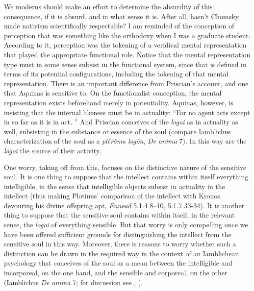 \documentclass[12pt]{article}
\begin{document}
We moderns should make an effort to determine the absurdity of this consequence, if it is absurd, and in what sense it is. After all, hasn't Chomsky made nativism scientifically respectable? I am reminded of the conception of perception that was something like the orthodoxy when I was a graduate student. According to it, perception was the tokening of a veridical mental representation that played the appropriate functional role. Notice that the mental representation type must in some sense subsist in the functional system, since that is defined in terms of its potential configurations, including the tokening of that mental representation. There is an important difference from Priscian's account, and one that Aquinas is sensitive to. On the functionalist conception, the mental representation exists beforehand merely in potentiality. Aquinas, however, is insisting that the internal likeness must be in actuality: ``For no agent acts except in so far as it is in act. '' And Priscian conceives of the \emph{logoi} as in actuality as well, subsisting in the substance or essence of the soul (compare Iamblichus characterization of the soul as a \emph{plêrôma} \emph{logôn}, \emph{De anima} 7). In this way are the \emph{logoi} the source of their activity.

One worry, taking off from this, focuses on the distinctive nature of the sensitive soul. It is one thing to suppose that the intellect contains within itself everything intelligible, in the sense that intelligible objects subsist in actuality in the intellect (thus making Plotinus' comparison of the intellect with Kronos devouring his divine offspring apt, \emph{Ennead} 5.1.4 8--10, 5.1.7 33-34). It is another thing to suppose that the sensitive soul contains within itself, in the relevant sense, the \emph{logoi} of everything sensible. But that worry is only compelling once we have been offered sufficient grounds for distinguishing the intellect from the sensitive soul in this way. Moreover, there is reasons to worry whether such a distinction can be drawn in the required way in the context of an Iamblichean psychology that conceives of the soul as a mean between the intelligible and incorporeal, on the one hand, and the sensible and corporeal, on the other (Iamblichus \emph{De anima} 7; for discussion see \citealt{Steel:1978th}, \citealt[91--93]{Finamore:2002yf}).
\end{document}
